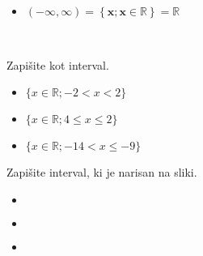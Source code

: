 \begin{itemize}
                    \item $ \mathbf{(-\infty,\infty)=\left\{x;x\in\mathbb{R}\right\} =\mathbb{R}}$ \\
                    
                    \begin{figure}[H]
                        \centering
                    \end{figure}

                \end{itemize}

            
            
                ~~~

        
            \begin{naloga}
                Zapišite kot interval.
                \begin{itemize}
                        \item $\{x\in\mathbb{R}; -2<x<2\}$ 
                        \item $\{x\in\mathbb{R}; 4\leq x\leq 2\}$ 
                        \item $\{x\in\mathbb{R}; -14<x\leq -9\}$ 
                \end{itemize}
            \end{naloga}
        


        
            \begin{naloga}
                Zapišite interval, ki je narisan na sliki.
                \begin{itemize}
                        \item $ $ 
                        \item $ $ 
                        \item $ $ 
                \end{itemize}
            \end{naloga}
        


